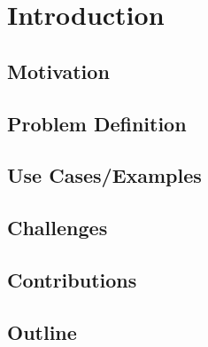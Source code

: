 
\chapter{Introduction}
\label{ch:intro}

\section{Motivation}
\label{sec:motivation}

\section{Problem Definition}

\section{Use Cases/Examples}

\section{Challenges}

\section{Contributions}

\section{Outline}
